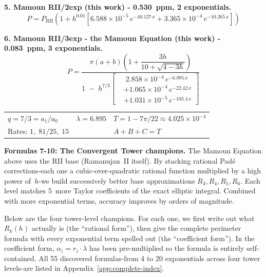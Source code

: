 \documentclass[12pt]{article}
\begin{document}
\bigskip

\noindent\textbf{5. Mamoun RII/2exp (this work) - 0.530~ppm, 2 exponentials.}
\begin{equation}
P = P_{\text{RII}}\!\left(1 + h^{0.01}\!\left[6.588{\times}10^{-5}\,e^{-40.127\,x} + 3.365{\times}10^{-4}\,e^{-10.265\,x}\right]\right)
\end{equation}

\bigskip

\noindent\textbf{6. Mamoun RII/3exp - the Mamoun Equation (this work) - 0.083~ppm, 3 exponentials.}
\begin{equation}
P = \frac{\pi(a{+}b)\!\left(1 + \dfrac{3h}{10+\sqrt{4-3h}}\right)}{1 \;-\; h^{7/3}\!\left[\begin{aligned}
&\; 2.858{\times}10^{-4}\,e^{-6.895\,x} \\[-2pt]
&+ 1.065{\times}10^{-4}\,e^{-22.42\,x} \\[-2pt]
&+ 1.031{\times}10^{-5}\,e^{-103.4\,x}
\end{aligned}\right]}
\end{equation}
\begin{center}\small
\begin{tabular}{lll}
$q = 7/3 = a_1/a_0$ & $\lambda = 6.895$ & $T = 1 - 7\pi/22 \approx 4.025 \times 10^{-4}$ \\
Rates: $1,\; 81/25,\; 15$ & & $A+B+C = T$
\end{tabular}
\end{center}

\bigskip

\bigskip
\noindent\textbf{Formulas 7-10: The Convergent Tower champions.}
The Mamoun Equation above uses the RII base (Ramanujan~II itself). By stacking rational Pad\'e corrections-each one a cubic-over-quadratic rational function multiplied by a high power of~$h$-we build successively better base approximations $R_3, R_4, R_5, R_6$. Each level matches 5~more Taylor coefficients of the exact elliptic integral. Combined with more exponential terms, accuracy improves by orders of magnitude.

Below are the four tower-level champions. For each one, we first write out what $R_k(h)$ actually is (the ``rational form''), then give the complete perimeter formula with every exponential term spelled out (the ``coefficient form''). In the coefficient form, $\alpha_i = r_i \cdot \lambda$ has been pre-multiplied so the formula is entirely self-contained. All 55 discovered formulas-from 4 to 20 exponentials across four tower levels-are listed in Appendix~\ref{app:complete-index}.
\end{document}
